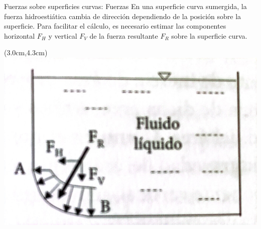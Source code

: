 \documentclass [xcolor=svgnames, t] {beamer}
\begin{document}
\begin{frame}{Fuerzas sobre superficies curvas: Fuerzas}
En una superficie curva sumergida, la fuerza hidroesti\'atica cambia de direcci\'on dependiendo de la posici\'on sobre la superficie. Para facilitar el c\'alculo, es necesario estimar las componentes horizontal $F_H$ y vertical $F_V$ de  la fuerza resultante $F_R$ sobre la superficie curva. 
\begin{textblock*}{6.5cm}(3.0cm,4.3cm) %
\includegraphics[width=\textwidth]{curb2}
\end{textblock*}
\end{frame}
\end{document}
